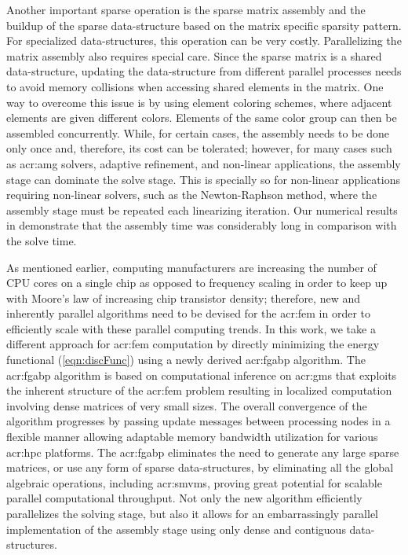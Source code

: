 Another important sparse operation is the sparse matrix assembly and the buildup of the sparse data-structure based on the matrix specific sparsity pattern.
For specialized data-structures, this operation can be very costly.
Parallelizing the matrix assembly also requires special care.
Since the sparse matrix is a shared data-structure, updating the data-structure from different parallel processes needs to avoid memory collisions when accessing shared elements in the matrix.
One way to overcome this issue is by using element coloring schemes, where adjacent elements are given different colors.
Elements of the same color group can then be assembled concurrently.
While, for certain cases, the assembly needs to be done only once and, therefore, its cost can be tolerated; however, for many cases such as \gls{acr:amg} solvers, adaptive refinement, and non-linear applications, the assembly stage can dominate the solve stage.
This is specially so for non-linear applications requiring non-linear solvers, such as the Newton-Raphson method, where the assembly stage must be repeated each linearizing iteration.
Our numerical results in  demonstrate that the assembly time was considerably long in comparison with the solve time.

As mentioned earlier, computing manufacturers are increasing the number of CPU cores on a single chip as opposed to frequency scaling in order to keep up with Moore's law \cite{bib:moore1965} of increasing chip transistor density; therefore, new and inherently parallel algorithms need to be devised for the \gls{acr:fem} in order to efficiently scale with these parallel computing trends.
In this work, we take a different approach for \gls{acr:fem} computation by directly minimizing the energy functional (\ref{eqn:discFunc}) using a newly derived \gls{acr:fgabp} algorithm.
The \gls{acr:fgabp} algorithm is based on computational inference on \glspl{acr:gm} that exploits the inherent structure of the \gls{acr:fem} problem resulting in localized computation involving dense matrices of very small sizes.
The overall convergence of the algorithm progresses by passing update messages between processing nodes in a flexible manner allowing adaptable memory bandwidth utilization for various \gls{acr:hpc} platforms.
The \gls{acr:fgabp} eliminates the need to generate any large sparse matrices, or use any form of sparse data-structures, by eliminating all the global algebraic operations, including \glspl{acr:smvm}, proving great potential for scalable parallel computational throughput.
Not only the new algorithm efficiently parallelizes the solving stage, but also it allows for an embarrassingly parallel implementation of the assembly stage using only dense and contiguous data-structures.


